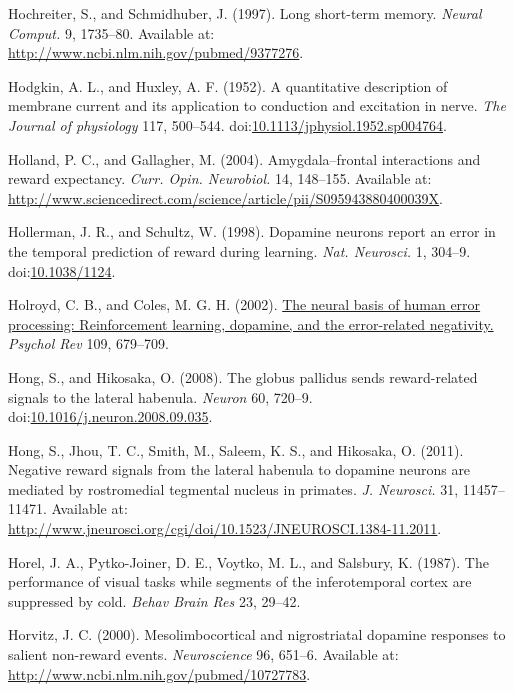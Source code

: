 \documentclass[
  11pt,
  a4paper,
]{scrbook}
\newlength{\cslhangindent}
\newenvironment{CSLReferences}[2] %
 {\begin{list}{}{%
  \setlength{\itemindent}{0pt}
  \setlength{\leftmargin}{0pt}
  \setlength{\parsep}{0pt}
  \ifodd #1
   \setlength{\leftmargin}{\cslhangindent}
   \setlength{\itemindent}{-1\cslhangindent}
  \fi
  \setlength{\itemsep}{#2\baselineskip}}}
 {\end{list}}
\begin{document}
\begin{CSLReferences}{1}{1}
Hochreiter, S., and Schmidhuber, J. (1997). {Long short-term memory.}
\emph{Neural Comput.} 9, 1735--80. Available at:
\url{http://www.ncbi.nlm.nih.gov/pubmed/9377276}.

Hodgkin, A. L., and Huxley, A. F. (1952). A quantitative description of
membrane current and its application to conduction and excitation in
nerve. \emph{The Journal of physiology} 117, 500--544.
doi:\href{https://doi.org/10.1113/jphysiol.1952.sp004764}{10.1113/jphysiol.1952.sp004764}.

Holland, P. C., and Gallagher, M. (2004). {Amygdala--frontal
interactions and reward expectancy}. \emph{Curr. Opin. Neurobiol.} 14,
148--155. Available at:
\url{http://www.sciencedirect.com/science/article/pii/S095943880400039X}.

Hollerman, J. R., and Schultz, W. (1998). {Dopamine neurons report an
error in the temporal prediction of reward during learning.} \emph{Nat.
Neurosci.} 1, 304--9.
doi:\href{https://doi.org/10.1038/1124}{10.1038/1124}.

Holroyd, C. B., and Coles, M. G. H. (2002).
\href{https://www.ncbi.nlm.nih.gov/pubmed/12374324}{The neural basis of
human error processing: Reinforcement learning, dopamine, and the
error-related negativity.} \emph{Psychol Rev} 109, 679--709.

Hong, S., and Hikosaka, O. (2008). {The globus pallidus sends
reward-related signals to the lateral habenula.} \emph{Neuron} 60,
720--9.
doi:\href{https://doi.org/10.1016/j.neuron.2008.09.035}{10.1016/j.neuron.2008.09.035}.

Hong, S., Jhou, T. C., Smith, M., Saleem, K. S., and Hikosaka, O.
(2011). {Negative reward signals from the lateral habenula to dopamine
neurons are mediated by rostromedial tegmental nucleus in primates.}
\emph{J. Neurosci.} 31, 11457--11471. Available at:
\url{http://www.jneurosci.org/cgi/doi/10.1523/JNEUROSCI.1384-11.2011}.

Horel, J. A., Pytko-Joiner, D. E., Voytko, M. L., and Salsbury, K.
(1987). The performance of visual tasks while segments of the
inferotemporal cortex are suppressed by cold. \emph{Behav Brain Res} 23,
29--42.

Horvitz, J. C. (2000). {Mesolimbocortical and nigrostriatal dopamine
responses to salient non-reward events.} \emph{Neuroscience} 96, 651--6.
Available at: \url{http://www.ncbi.nlm.nih.gov/pubmed/10727783}.


\end{CSLReferences}
\end{document}

